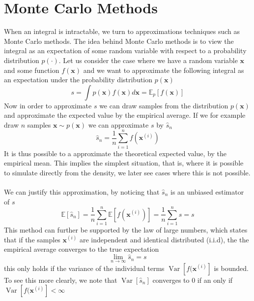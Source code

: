 \section{Monte Carlo Methods}
When an integral is intractable, we turn to approximations techniques such as Monte Carlo methods. The idea behind Monte Carlo methods is to view the integral as an expectation of some random variable with respect to a probability distribution $p(\cdot)$. Let us consider the case where we have a random variable $\mathbf{x}$ and some function $f(\mathbf{x})$ and we want to approximate the following integral as an expectation under the probability distribution $p(\mathbf{x})$ 
\begin{equation*}
    s=\int p(\mathbf{x}) f(\mathbf{x}) d \mathbf{x}=\mathbb{E}_{p}[f(\mathbf{x})]
\end{equation*}
Now in order to approximate $s$ we can draw samples from the distribution $p(\mathbf{x})$ and approximate the expected value by the empirical average. If we for example draw $n$ samples $\mathbf{x}\sim p(\mathbf{x})$ we can approximate $s$ by $\hat{s}_n$
\begin{equation*}
        \hat{s}_{n}=\frac{1}{n} \sum_{i=1}^{n} f\left(\mathbf{x}^{(i)}\right)
\end{equation*}
It is thus possible to a approximate the theoretical expected value, by the empirical mean. This implies the simplest situation, that is, where it is possible to simulate directly from the density, we later see cases where this is not possible.\\
\\
We can justify this approximation, by noticing that $\hat{s}_n$ is an unbiased estimator of $s$
\begin{equation*}
    \mathbb{E}\left[\hat{s}_{n}\right]=\frac{1}{n} \sum_{i=1}^{n} \mathbb{E}\left[f\left(\mathbf{x}^{(i)}\right)\right]=\frac{1}{n} \sum_{i=1}^{n} s=s
\end{equation*}
This method can further be supported by the law of large numbers, which states that if the samples $\mathbf{x}^{(i)}$ are independent and identical distributed (i.i.d), the the empirical average converges to the true expectation
\begin{equation*}
    \lim _{n \rightarrow \infty} \hat{s}_{n}=s
\end{equation*}
this only holds if the variance of the individual terms $\operatorname{Var}[f(\mathbf{x}^{(i)}]$ is bounded. To see this more clearly, we note that $\operatorname{Var}[\hat{s}_n]$ converges to 0 if an only if $\operatorname{Var}[f(\mathbf{x}^{(i)}]<\infty$
